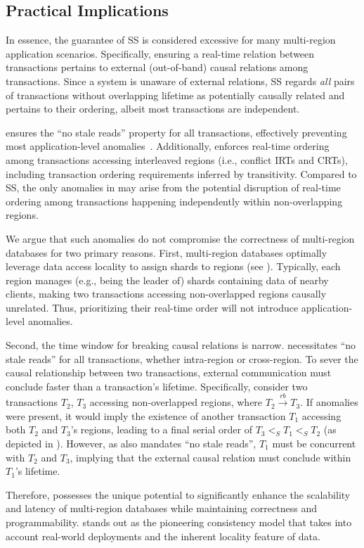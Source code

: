 \subsection{Practical Implications}\label{sec:rls:practical}

In essence, the guarantee of SS is considered excessive for many multi-region application scenarios. Specifically, ensuring a real-time relation between transactions pertains to external (out-of-band) causal relations among transactions. 
Since a system is unaware of external relations, SS regards \textit{all} pairs of transactions without overlapping lifetime as potentially causally related and pertains to their ordering, albeit most transactions are independent. 
 
\xxcons ensures the ``no stale reads'' property for all transactions, effectively preventing most application-level anomalies~\cite{viotti2016consistency}. Additionally, \xxcons enforces real-time ordering among transactions accessing interleaved regions (i.e., conflict IRTs and CRTs), including transaction ordering requirements inferred by transitivity. Compared to SS, the only anomalies in \xxcons may arise from the potential disruption of real-time ordering among transactions happening independently within non-overlapping regions. 

We argue that such anomalies do not compromise the correctness of multi-region databases for two primary reasons. First, multi-region databases optimally leverage data access locality to assign shards to regions (see ). Typically, each region manages (e.g., being the leader of) shards containing data of nearby clients, making two transactions accessing non-overlapped regions causally unrelated. Thus, prioritizing their real-time order will not introduce application-level anomalies. 


Second, the time window for breaking causal relations is narrow. \xxcons necessitates ``no stale reads'' for all transactions, whether intra-region or cross-region. To sever the causal relationship between two transactions, external communication must conclude faster than a transaction's lifetime. 
Specifically, consider two transactions $T_2$, $T_3$ accessing non-overlapped regions, where $T_2 \xrightarrow{rb} T_3$. If anomalies were present, it would imply the existence of another transaction $T_1$ accessing both $T_2$ and $T_3$'s regions, leading to a final serial order of $T_3 <_S T_1 <_S T_2$ (as depicted in ). However, as \xxcons also mandates ``no stale reads'', $T_1$ must be concurrent with $T_2$ and $T_3$, implying that the external causal relation must conclude within $T_1$'s lifetime. 


Therefore, \xxcons possesses the unique potential to significantly enhance the scalability and latency of multi-region databases while maintaining correctness and programmability. \xxcons stands out as the pioneering consistency model that takes into account real-world deployments and the inherent locality feature of data.